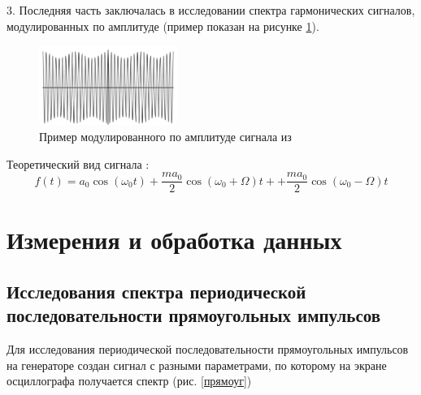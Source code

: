 \documentclass[a4paper,12pt]{article} %
\begin{document}
3. Последняя часть заключалась в исследовании спектра гармонических сигналов, модулированных по амплитуде  (пример показан на рисунке \ref{модулированный}).
\begin{figure}[h!]
\begin{center}
\includegraphics[width=0.4\textwidth]{Модулированный}
\caption{Пример модулированного по амплитуде сигнала из \cite{labnik}} \label{модулированный}
\end{center}
\end{figure}
Теоретический вид сигнала \cite{labnik}: 
\begin{equation}
f(t) = a_0 \cos (\omega_0 t) +\dfrac{ma_0}{2}\cos (\omega_0 +\Omega)t++\dfrac{ma_0}{2}\cos (\omega_0 -\Omega)t
\end{equation}



\section{Измерения и обработка данных}
\subsection*{Исследования спектра периодической последовательности прямоугольных импульсов}
Для исследования периодической последовательности прямоугольных импульсов на генераторе создан сигнал с разными параметрами, по которому на экране осциллографа получается спектр (рис. \ref{прямоуг})
\end{document}
